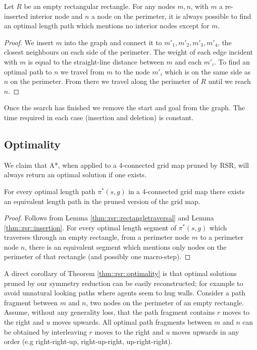 \begin{lemma}
\label{thm::rsr::insertion}
Let $R$ be an empty rectangular rectangle.
For any nodes $m, n$, with $m$ a re-inserted interior node and $n$ a node on the perimeter,
it is always possible to find an optimal length path which mentions no interior nodes except for $m$.
\end{lemma}
\begin{proof}
We insert $m$ into the graph and connect it to $m'_{1}, m'_{2}, m'_{3},
m'_{4}$, the closest neighbours on each side of the perimeter.  The weight of
each edge incident with $m$ is equal to the straight-line distance between $m$
and each $m'_{i}$.  To find an optimal path to $n$ we travel from $m$ to the
node $m'_{i}$ which is on the same side as $n$ on the perimeter.  From there
we travel along the perimeter of $R$ until we reach $n$.
\end{proof}

Once the search has finished we remove the start and goal from the graph.
The time required in each case (insertion and deletion) is constant.

\subsection{Optimality}
\label{char::rsr::optimal4c}
We claim that A*, when applied to a 4-connected grid map pruned by RSR, 
will always return an optimal solution if one exists.

\begin{theorem}
\label{thm::rsr::optimality}
For every optimal length path $\pi^*(s, g)$ in a 4-connected grid map there exists
an equivalent length path in the pruned version of the grid map.
\end{theorem}
\begin{proof}
Follows from Lemma \ref{thm::rsr::rectangletraversal} and Lemma \ref{thm::rsr::insertion}.
For every optimal length segment of $\pi^{*}(s, g)$ which traverses
through an empty rectangle, from a perimeter node $m$ to a perimeter node $n$, 
there is an equivalent segment which mentions only nodes
on the perimeter of that rectangle (and possibly one macro-step).
\end{proof}

A direct corollary of Theorem \ref{thm::rsr::optimality} is that optimal
solutions pruned by our symmetry reduction can be easily reconstructed; for
example to avoid unnatural looking paths where agents seem to hug walls.
Consider a path fragment between $m$ and $n$, two nodes on the perimeter of an
empty rectangle.  Assume, without any generality loss, that the path fragment
contains $r$ moves to the right and $u$ moves upwards.  All optimal path
fragments between $m$ and $n$ can be obtained by interleaving $r$ moves to the
right and $u$ moves upwards in any order (e.g right-right-up, right-up-right,
up-right-right).


